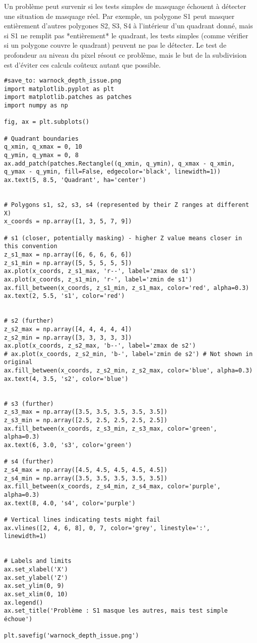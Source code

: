 \documentclass{article}
\begin{document}
Un problème peut survenir si les tests simples de masquage échouent à détecter une situation de masquage réel. Par exemple, un polygone S1 peut masquer entièrement d'autres polygones S2, S3, S4 à l'intérieur d'un quadrant donné, mais si S1 ne remplit pas *entièrement* le quadrant, les tests simples (comme vérifier si un polygone couvre le quadrant) peuvent ne pas le détecter. Le test de profondeur au niveau du pixel résout ce problème, mais le but de la subdivision est d'éviter ces calculs coûteux autant que possible.

\begin{verbatim}
#save_to: warnock_depth_issue.png
import matplotlib.pyplot as plt
import matplotlib.patches as patches
import numpy as np

fig, ax = plt.subplots()

# Quadrant boundaries
q_xmin, q_xmax = 0, 10
q_ymin, q_ymax = 0, 8
ax.add_patch(patches.Rectangle((q_xmin, q_ymin), q_xmax - q_xmin, q_ymax - q_ymin, fill=False, edgecolor='black', linewidth=1))
ax.text(5, 8.5, 'Quadrant', ha='center')


# Polygons s1, s2, s3, s4 (represented by their Z ranges at different X)
x_coords = np.array([1, 3, 5, 7, 9])

# s1 (closer, potentially masking) - higher Z value means closer in this convention
z_s1_max = np.array([6, 6, 6, 6, 6])
z_s1_min = np.array([5, 5, 5, 5, 5])
ax.plot(x_coords, z_s1_max, 'r--', label='zmax de s1')
ax.plot(x_coords, z_s1_min, 'r-', label='zmin de s1')
ax.fill_between(x_coords, z_s1_min, z_s1_max, color='red', alpha=0.3)
ax.text(2, 5.5, 's1', color='red')


# s2 (further)
z_s2_max = np.array([4, 4, 4, 4, 4])
z_s2_min = np.array([3, 3, 3, 3, 3])
ax.plot(x_coords, z_s2_max, 'b--', label='zmax de s2')
# ax.plot(x_coords, z_s2_min, 'b-', label='zmin de s2') # Not shown in original
ax.fill_between(x_coords, z_s2_min, z_s2_max, color='blue', alpha=0.3)
ax.text(4, 3.5, 's2', color='blue')


# s3 (further)
z_s3_max = np.array([3.5, 3.5, 3.5, 3.5, 3.5])
z_s3_min = np.array([2.5, 2.5, 2.5, 2.5, 2.5])
ax.fill_between(x_coords, z_s3_min, z_s3_max, color='green', alpha=0.3)
ax.text(6, 3.0, 's3', color='green')

# s4 (further)
z_s4_max = np.array([4.5, 4.5, 4.5, 4.5, 4.5])
z_s4_min = np.array([3.5, 3.5, 3.5, 3.5, 3.5])
ax.fill_between(x_coords, z_s4_min, z_s4_max, color='purple', alpha=0.3)
ax.text(8, 4.0, 's4', color='purple')

# Vertical lines indicating tests might fail
ax.vlines([2, 4, 6, 8], 0, 7, color='grey', linestyle=':', linewidth=1)


# Labels and limits
ax.set_xlabel('X')
ax.set_ylabel('Z')
ax.set_ylim(0, 9)
ax.set_xlim(0, 10)
ax.legend()
ax.set_title('Problème : S1 masque les autres, mais test simple échoue')

plt.savefig('warnock_depth_issue.png')

\end{verbatim}
\end{document}
